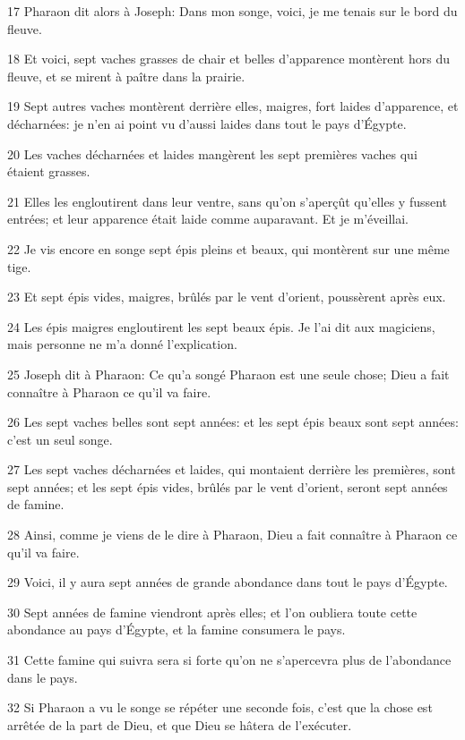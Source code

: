 \par 17 Pharaon dit alors à Joseph: Dans mon songe, voici, je me tenais sur le bord du fleuve.
\par 18 Et voici, sept vaches grasses de chair et belles d'apparence montèrent hors du fleuve, et se mirent à paître dans la prairie.
\par 19 Sept autres vaches montèrent derrière elles, maigres, fort laides d'apparence, et décharnées: je n'en ai point vu d'aussi laides dans tout le pays d'Égypte.
\par 20 Les vaches décharnées et laides mangèrent les sept premières vaches qui étaient grasses.
\par 21 Elles les engloutirent dans leur ventre, sans qu'on s'aperçût qu'elles y fussent entrées; et leur apparence était laide comme auparavant. Et je m'éveillai.
\par 22 Je vis encore en songe sept épis pleins et beaux, qui montèrent sur une même tige.
\par 23 Et sept épis vides, maigres, brûlés par le vent d'orient, poussèrent après eux.
\par 24 Les épis maigres engloutirent les sept beaux épis. Je l'ai dit aux magiciens, mais personne ne m'a donné l'explication.
\par 25 Joseph dit à Pharaon: Ce qu'a songé Pharaon est une seule chose; Dieu a fait connaître à Pharaon ce qu'il va faire.
\par 26 Les sept vaches belles sont sept années: et les sept épis beaux sont sept années: c'est un seul songe.
\par 27 Les sept vaches décharnées et laides, qui montaient derrière les premières, sont sept années; et les sept épis vides, brûlés par le vent d'orient, seront sept années de famine.
\par 28 Ainsi, comme je viens de le dire à Pharaon, Dieu a fait connaître à Pharaon ce qu'il va faire.
\par 29 Voici, il y aura sept années de grande abondance dans tout le pays d'Égypte.
\par 30 Sept années de famine viendront après elles; et l'on oubliera toute cette abondance au pays d'Égypte, et la famine consumera le pays.
\par 31 Cette famine qui suivra sera si forte qu'on ne s'apercevra plus de l'abondance dans le pays.
\par 32 Si Pharaon a vu le songe se répéter une seconde fois, c'est que la chose est arrêtée de la part de Dieu, et que Dieu se hâtera de l'exécuter.
